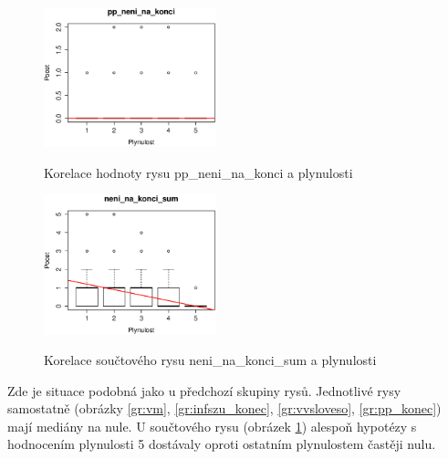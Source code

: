 \documentclass[12pt,a4paper]{report}
\begin{document}
\begin{figure}[!htb]
\begin{center}
  \centering\includegraphics[width=50mm]{./grafy/rysy/pp_neni_na_konci.eps}
  \caption{Korelace hodnoty rysu pp\_neni\_na\_konci a plynulosti}\label{gr:pp_konec}
\endminipage\quad
{} 
  \centering\includegraphics[width=50mm]{./grafy/rysy/neni_na_konci_sum.eps}
  \caption{Korelace součtového rysu neni\_na\_konci\_sum a plynulosti}\label{gr:sumneni}
\endminipage
\end{center}
\end{figure}


Zde je situace podobná jako u předchozí skupiny rysů. Jednotlivé rysy samostatně (obrázky \ref{gr:vm}, \ref{gr:infszu_konec}, \ref{gr:vvsloveso}, \ref{gr:pp_konec}) mají mediány na nule. U součtového rysu (obrázek \ref{gr:sumneni}) alespoň hypotézy s hodnocením plynulosti 5 dostávaly oproti ostatním plynulostem častěji nulu.
\end{document}
